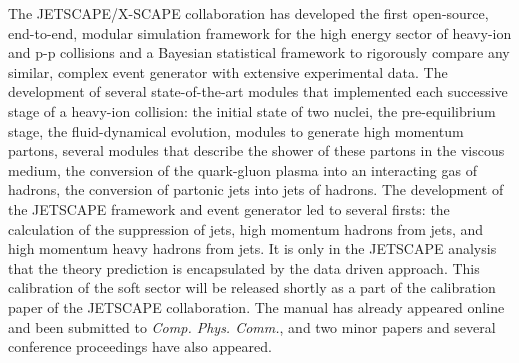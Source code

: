 \documentclass[11pt]{NSFamsart}
\begin{document}
The JETSCAPE/X-SCAPE collaboration has developed the first open-source, end-to-end, modular simulation framework for the high energy sector of heavy-ion and p-p collisions and a Bayesian statistical framework to rigorously compare any similar, complex event generator with extensive experimental data. The development of several state-of-the-art modules that implemented each successive stage of a heavy-ion collision: the initial state of two nuclei, the pre-equilibrium stage, the fluid-dynamical evolution, modules to generate high momentum partons, several modules that describe the shower of these partons in the viscous medium, the conversion of
the quark-gluon plasma into an interacting gas of hadrons, the conversion of partonic jets into jets of hadrons. The development of the JETSCAPE framework and event generator led to several firsts: the calculation of the suppression of jets, high momentum hadrons from jets, and high momentum heavy hadrons from jets. It is only in the JETSCAPE analysis that the theory prediction is encapsulated by the data driven approach. This calibration of the soft sector will be released shortly as a part of the calibration paper of the JETSCAPE collaboration. The manual has already appeared online \cite{putschke2019jetscape} and been submitted to \textit{Comp. Phys. Comm.}, and two minor papers \cite{cao2017multistage,kumar2019jetscape} and several conference proceedings \cite{soltz2018bayesian,tachibana2018jet,kauder2019jetscape,park2019multi} have also appeared.
\end{document}
